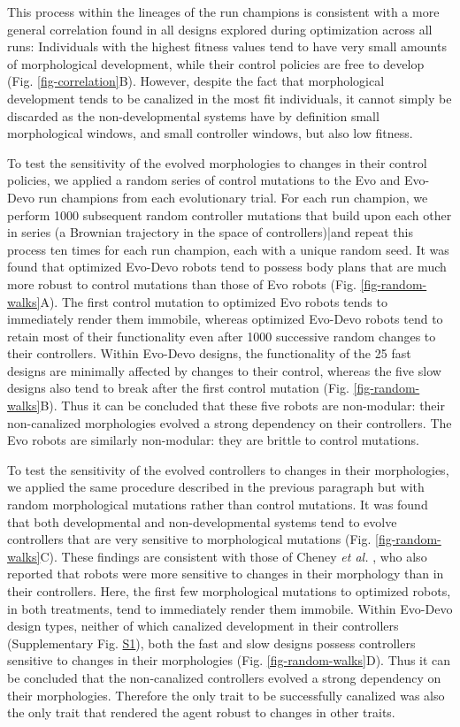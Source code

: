 This process within the lineages of the run champions is consistent with a more general correlation found in all designs explored during optimization across all runs: Individuals with the highest fitness values tend to have very small amounts of morphological development, while their control policies are free to develop (Fig. \ref{fig-correlation}B).
However, despite the fact that morphological development tends to be canalized in the most fit individuals, it cannot simply be discarded as the non-developmental systems have by definition small morphological windows, and small controller windows, but also low fitness.  


To test the sensitivity of the evolved morphologies to changes in their control policies, we applied a random series of control mutations to the Evo and Evo-Devo run champions from each evolutionary trial.
For each run champion, we perform 1000 subsequent random controller mutations that build upon each other in series (a Brownian trajectory in the space of controllers)|and repeat this process ten times for each run champion, each with a unique random seed.
It was found that optimized Evo-Devo robots tend to possess body plans that are much more robust to control mutations than those of Evo robots (Fig. \ref{fig-random-walks}A).
The first control mutation to optimized Evo robots tends to immediately render them immobile, whereas optimized Evo-Devo robots tend to retain most of their functionality even after 1000 successive random changes to their controllers.
Within Evo-Devo designs, the functionality of the 25 fast designs are minimally affected by changes to their control, whereas the five slow designs also tend to break after the first control mutation (Fig. \ref{fig-random-walks}B). 
Thus it can be concluded that these five robots are non-modular: their non-canalized morphologies evolved a strong dependency on their controllers. 
The Evo robots are similarly non-modular: they are brittle to control mutations. 


To test the sensitivity of the evolved controllers to changes in their morphologies, we applied the same procedure described in the previous paragraph but with random morphological mutations rather than control mutations.
It was found that both developmental and non-developmental systems tend to evolve controllers that are very sensitive to morphological mutations (Fig. \ref{fig-random-walks}C).
These findings are consistent with those of Cheney \textit{et al.} \cite{cheney2017scalable}, who also reported that robots were more sensitive to changes in their morphology than in their controllers.
Here, the first few morphological mutations to optimized robots, in both treatments, tend to immediately render them immobile.
Within Evo-Devo design types, neither of which canalized development in their controllers (Supplementary Fig. \hyperref[fig:S1]{S1}), both the fast and slow designs possess controllers sensitive to changes in their morphologies (Fig. \ref{fig-random-walks}D).
Thus it can be concluded that the non-canalized controllers evolved a strong dependency on their morphologies. 
Therefore the only trait to be successfully canalized was also the only trait that rendered the agent robust to changes in other traits.



